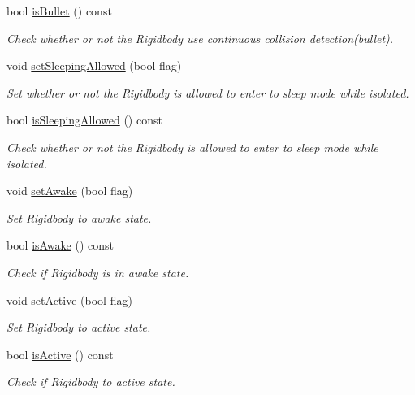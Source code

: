 \begin{DoxyCompactItemize}
bool \hyperlink{class_i_dream_sky_1_1_physics3_1_1_vehicle_a370405932936bb8618ae468c0eaf6556}{is\+Bullet} () const 
\begin{DoxyCompactList}\small\item\em Check whether or not the Rigidbody use continuous collision detection(bullet). \end{DoxyCompactList}\item 
void \hyperlink{class_i_dream_sky_1_1_physics3_1_1_vehicle_a04052a56ce0d86e1d2daf2ca501b9159}{set\+Sleeping\+Allowed} (bool flag)
\begin{DoxyCompactList}\small\item\em Set whether or not the Rigidbody is allowed to enter to sleep mode while isolated. \end{DoxyCompactList}\item 
bool \hyperlink{class_i_dream_sky_1_1_physics3_1_1_vehicle_ae6af97deb8fe198f4c770ef42ba0a8a7}{is\+Sleeping\+Allowed} () const 
\begin{DoxyCompactList}\small\item\em Check whether or not the Rigidbody is allowed to enter to sleep mode while isolated. \end{DoxyCompactList}\item 
void \hyperlink{class_i_dream_sky_1_1_physics3_1_1_vehicle_ad998501ff010394aa04e8e97271d6788}{set\+Awake} (bool flag)
\begin{DoxyCompactList}\small\item\em Set Rigidbody to awake state. \end{DoxyCompactList}\item 
bool \hyperlink{class_i_dream_sky_1_1_physics3_1_1_vehicle_a916747608b54c6bc6cd0c6be4750335c}{is\+Awake} () const 
\begin{DoxyCompactList}\small\item\em Check if Rigidbody is in awake state. \end{DoxyCompactList}\item 
void \hyperlink{class_i_dream_sky_1_1_physics3_1_1_vehicle_a858252cbc1d99962ab499478fd17c593}{set\+Active} (bool flag)
\begin{DoxyCompactList}\small\item\em Set Rigidbody to active state. \end{DoxyCompactList}\item 
bool \hyperlink{class_i_dream_sky_1_1_physics3_1_1_vehicle_a9eeaf583e86ebba29c523a4629b1cbfc}{is\+Active} () const 
\begin{DoxyCompactList}\small\item\em Check if Rigidbody to active state. \end{DoxyCompactList}\item 

\end{DoxyCompactItemize}
